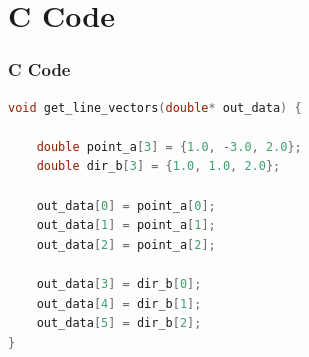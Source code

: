 \documentclass{beamer}
\theoremstyle{remark}
\numberwithin{equation}{section}
\begin{document}
\section{C Code}
\begin{frame}[fragile]
\frametitle{C Code}
\begin{lstlisting}[language=C]
void get_line_vectors(double* out_data) {
 
    double point_a[3] = {1.0, -3.0, 2.0};
    double dir_b[3] = {1.0, 1.0, 2.0};
    
    out_data[0] = point_a[0];
    out_data[1] = point_a[1];
    out_data[2] = point_a[2];
    
    out_data[3] = dir_b[0];
    out_data[4] = dir_b[1];
    out_data[5] = dir_b[2];
}
    \end{lstlisting}
\end{frame}
\end{document}
